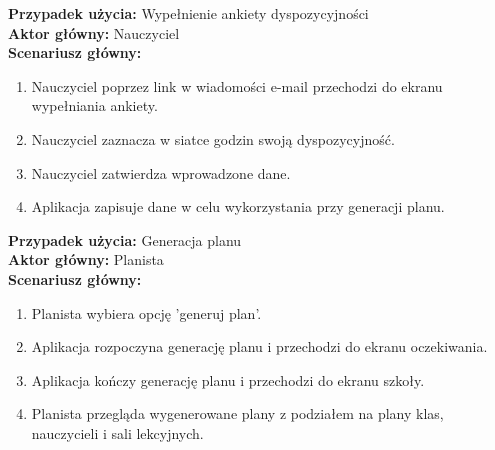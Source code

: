 \noindent
\textbf{Przypadek użycia:} Wypełnienie ankiety dyspozycyjności\\
\textbf{Aktor główny:} Nauczyciel\\
\textbf{Scenariusz główny:}
\begin{enumerate}
	\item Nauczyciel poprzez link w wiadomości e-mail przechodzi do ekranu wypełniania ankiety.
	\item Nauczyciel zaznacza w siatce godzin swoją dyspozycyjność.
	\item Nauczyciel zatwierdza wprowadzone dane.
	\item Aplikacja zapisuje dane w celu wykorzystania przy generacji planu.
\end{enumerate}

\noindent
\textbf{Przypadek użycia:} Generacja planu\\
\textbf{Aktor główny:} Planista\\
\textbf{Scenariusz główny:}
\begin{enumerate}
	\item Planista wybiera opcję 'generuj plan'.
	\item Aplikacja rozpoczyna generację planu i przechodzi do ekranu oczekiwania.
	\item Aplikacja kończy generację planu i przechodzi do ekranu szkoły.
	\item Planista przegląda wygenerowane plany z podziałem na plany klas, nauczycieli i sali lekcyjnych.
\end{enumerate}
